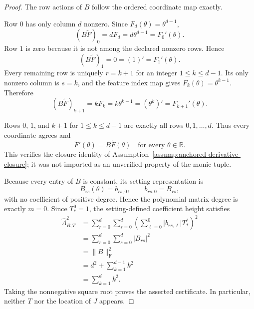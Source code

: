 \begin{proof}
The row actions of \(B\) follow the ordered coordinate map exactly.

Row \(0\) has only column \(d\) nonzero. Since
\(F_d(\theta)=\theta^{d-1}\),
\begin{equation}
\label{eq:appendix-indented-005}
  (B\widetilde F)_0=dF_d=d\theta^{d-1}=F_0'(\theta).
\end{equation}
Row \(1\) is zero because it is not among the declared nonzero rows. Hence
\begin{equation}
\label{eq:appendix-indented-006}
  (B\widetilde F)_1=0=(1)'=F_1'(\theta).
\end{equation}
Every remaining row is uniquely \(r=k+1\) for an integer
\(1\leq k\leq d-1\). Its only nonzero column is \(s=k\), and the feature
index map gives \(F_k(\theta)=\theta^{k-1}\). Therefore
\begin{equation}
\label{eq:appendix-indented-007}
  (B\widetilde F)_{k+1}
  =kF_k
  =k\theta^{k-1}
  =(\theta^k)'
  =F_{k+1}'(\theta).
\end{equation}

Rows \(0\), \(1\), and \(k+1\) for \(1\leq k\leq d-1\) are exactly all rows \(0,1,\ldots,d\). Thus every coordinate agrees and
\begin{equation}
\label{eq:appendix-display-262}
\widetilde F'(\theta)=B\widetilde F(\theta)
\quad\text{for every }\theta\in\mathbb R.
\end{equation}
This verifies the closure identity of Assumption~\ref{assump:anchored-derivative-closure}; it was not imported as an unverified property of the monic tuple.

Because every entry of \(B\) is constant, its setting representation is
\begin{equation}
\label{eq:appendix-display-263}
B_{rs}(\theta)=b_{rs,0},
\qquad
b_{rs,0}=B_{rs},
\end{equation}
with no coefficient of positive degree. Hence the polynomial matrix degree is exactly \(m=0\). Since \(T_*^0=1\), the setting-defined coefficient height satisfies
\begin{equation}
\label{eq:appendix-display-264}
\begin{aligned}
\widehat\Lambda_{B,T}^{2}
&=\sum_{r=0}^{d}\sum_{s=0}^{d}
  \left(\sum_{\ell=0}^{0}\lvert b_{rs,\ell}\rvert T_*^\ell\right)^2\\
&=\sum_{r=0}^{d}\sum_{s=0}^{d}\lvert B_{rs}\rvert^2\\
&=\lVert B\rVert_{\mathrm F}^{2}\\
&=d^2+\sum_{k=1}^{d-1}k^2\\
&=\sum_{k=1}^{d}k^2.
\end{aligned}
\end{equation}
Taking the nonnegative square root proves the asserted certificate. In particular, neither \(T\) nor the location of \(J\) appears.


\end{proof}
